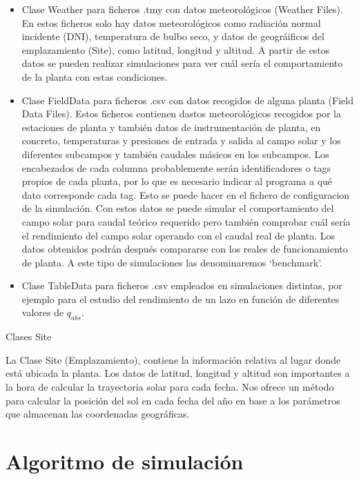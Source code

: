 \documentclass[12pt]{report} %
\begin{document}
\begin{itemize}
\item
  Clase Weather para ficheros .tmy con datos meteorológicos (Weather   Files). En estos ficheros solo hay datos meteorológicos como radiación   normal incidente (DNI), temperatura de bulbo seco, y datos de   geográificos del emplazamiento (Site), como latitud, longitud y   altitud. A partir de estos datos se pueden realizar simulaciones para   ver cuál sería el comportamiento de la planta con estas condiciones.
\item
  Clase FieldData para ficheros .csv con datos recogidos de alguna   planta (Field Data Files). Estos ficheros contienen dastos   meteorológicos recogidos por la estaciones de planta y también datos   de instrumentación de planta, en concreto, temperaturas y presiones de   entrada y salida al campo solar y los diferentes subcampos y también   caudales másicos en los subcampos. Los encabezados de cada columna   probablemente serán identificadores o tags propios de cada planta, por
  lo que es necesario indicar al programa a qué dato corresponde cada   tag. Esto se puede hacer en el fichero de configuracion de la   simulación. Con estos datos se puede simular el comportamiento del   campo solar para caudal teórico requerido pero también comprobar cuál   sería el rendimiento del campo solar operando con el caudal real de  planta. Los datos obtenidos podrán después compararse con los reales   de funcionamiento de planta. A este tipo de simulaciones las   denominaremos `benchmark'.
\item
  Clase TableData para ficheros .csv empleados en simulaciones   distintas, por ejemplo para el estudio del rendimiento de un lazo en   función de diferentes valores de \(q_{abs}\).
\end{itemize}

\hypertarget{clases-site}{Clases Site}

La Clase Site (Emplazamiento), contiene la información relativa al lugar donde está ubicada la planta. Los datos de latitud, longitud y altitud son importantes a la hora de calcular la trayectoria solar para cada fecha. Nos ofrece un método para calcular la posición del sol en cada fecha del año en base a los parámetros que almacenan las coordenadas geográficas. 

\section{Algoritmo de simulación}
\end{document}
